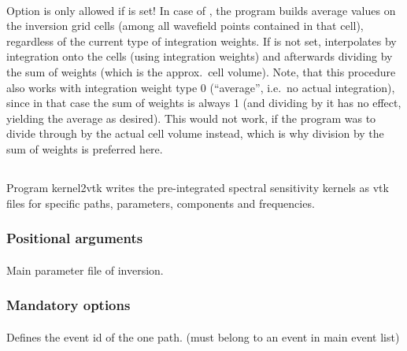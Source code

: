 \paragraph{}
Option  is only allowed if  is set! In case of ,
the program builds average values on the inversion grid cells (among all wavefield points contained in that cell),
regardless of the current type of integration weights. If  is not set,  
interpolates by integration onto the cells (using integration weights) and afterwards dividing by the sum of 
weights (which is the approx.\ cell volume). Note, that this procedure also works with integration weight type
0 (``average'', i.e.\ no actual integration), since in that case the sum of weights is always 1 (and dividing
by it has no effect, yielding the average as desired). This would not work, if the program was to divide through
by the actual cell volume instead, which is why division by the sum of weights is preferred here.
%
%
\subsection{} \label{programs_scripts,sec:bin_prog,sec:kernel_2_vtk}
Program kernel2vtk writes the pre-integrated spectral sensitivity kernels as vtk files for specific paths, parameters, components and frequencies.
\subsubsection{Positional arguments}
\paragraph{}
Main parameter file of inversion.
\subsubsection{Mandatory options}
\paragraph{ }
Defines the event id of the one path. (must belong to an event in main event list)
